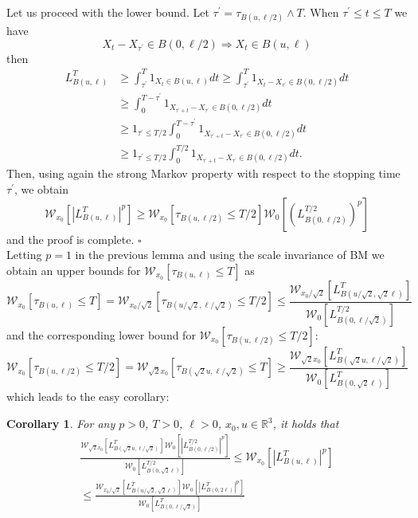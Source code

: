 \documentclass[a4paper,12pt]{article}
\newtheorem{corollary}{Corollary}
\begin{document}
Let us proceed with the lower bound. Let $\tau^{\prime}=\tau_{B(u,\ell
/2)}\wedge T$. When $\tau^{\prime}\leq t\leq T$ we have
\[
X_{t}-X_{\tau^{\prime}}\in B(0,\ell/2)\Rightarrow X_{t}\in B(u,\ell)
\]
then
\[%
\begin{split}
L_{B(u,\ell)}^{T}  &  \geq\int_{\tau^{\prime}}^{T}1_{X_{t}\in B(u,\ell)}%
dt\geq\int_{\tau^{\prime}}^{T}1_{X_{t}-X_{\tau^{\prime}}\in B(0,\ell/2)}dt\\
&  \geq\int_{0}^{T-\tau^{\prime}}1_{X_{\tau^{\prime}+t}-X_{\tau^{\prime}}\in
B(0,\ell/2)}dt\\
&  \geq1_{\tau^{\prime}\leq T/2}\int_{0}^{T-\tau^{\prime}}1_{X_{\tau^{\prime
}+t}-X_{\tau^{\prime}}\in B(0,\ell/2)}dt\\
&  \geq1_{\tau^{\prime}\leq T/2}\int_{0}^{T/2}1_{X_{\tau^{\prime}+t}%
-X_{\tau^{\prime}}\in B(0,\ell/2)}dt.
\end{split}
\]
Then, using again the strong Markov property with respect to the stopping time
$\tau^{\prime}$, we obtain
\[
\mathcal{W}_{x_{0}}[|L_{B(u,\ell)}^{T}|^{p}]\geq\mathcal{W}_{x_{0}}%
[\tau_{B(u,\ell/2)}\leq T/2]\mathcal{W}_{0}[(L_{B(0,\ell/2)}^{T/2})^{p}]
\]
and the proof is complete. \hfill$\square$\\[0.5cm]

Letting $p=1$ in the previous lemma and using the scale invariance of BM we
obtain an upper bounds for $\mathcal{W}_{x_{0}}[\tau_{B(u,\ell)}\leq T]$ as
\[
\mathcal{W}_{x_{0}}[\tau_{B(u,\ell)}\leq T]=\mathcal{W}_{x_{0}/\sqrt{2}}%
[\tau_{B(u/\sqrt{2},\ell/\sqrt{2})}\leq T/2]\leq\frac{\mathcal{W}_{x_{0}%
/\sqrt{2}}[L_{B(u/\sqrt{2},\sqrt{2}\ell)}^{T}]}{\mathcal{W}_{0}[L_{B(0,\ell
/\sqrt{2})}^{T/2}]}%
\]
and the corresponding lower bound for $\mathcal{W}_{x_{0}}[\tau_{B(u,\ell
/2)}\leq T/2]$:
\[
\mathcal{W}_{x_{0}}[\tau_{B(u,\ell/2)}\leq T/2]=\mathcal{W}_{\sqrt{2}x_{0}%
}[\tau_{B(\sqrt{2}u,\ell/\sqrt{2})}\leq T]\geq\frac{\mathcal{W}_{\sqrt{2}%
x_{0}}[L_{B(\sqrt{2}u,\ell/\sqrt{2})}^{T}]}{\mathcal{W}_{0}[L_{B(0,\sqrt
{2}\ell)}^{T}]}%
\]
which leads to the easy corollary:

\begin{corollary}
For any $p>0$, $T>0$, $\ell>0$, $x_{0},u\in\mathbb{R}^{3}$, it holds that
\begin{multline}
\frac{\mathcal{W}_{\sqrt{2}x_{0}}[L_{B(\sqrt{2}u,\ell/\sqrt{2})}%
^{T}]\mathcal{W}_{0}[|L_{B(0,\ell/2)}^{T/2}|^{p}]}{\mathcal{W}_{0}%
[L_{B(0,\sqrt{2}\ell)}^{T/2}]}\leq\mathcal{W}_{x_{0}}[|L_{B(u,\ell)}^{T}%
|^{p}]\label{eq:Lmoments-bound2}\\
\leq\frac{\mathcal{W}_{x_{0}/\sqrt{2}}[L_{B(u/\sqrt{2},\sqrt{2}\ell)}%
^{T}]\mathcal{W}_{0}[|L_{B(0,2\ell)}^{T}|^{p}]}{\mathcal{W}_{0}[L_{B(0,\ell
/\sqrt{2})}^{T}]}%
\end{multline}
\end{corollary}
\end{document}
